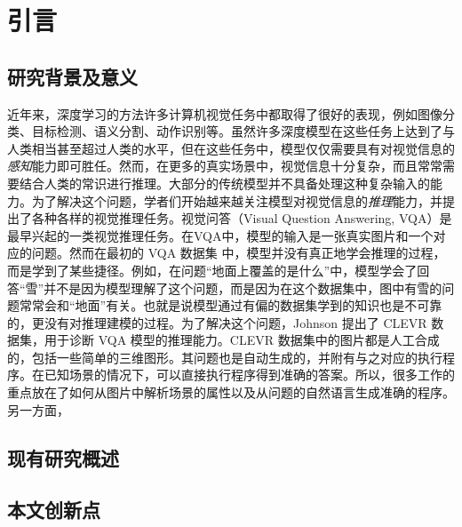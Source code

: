 
\chapter{引言}
\label{cha:intro}

\section{研究背景及意义}
近年来，深度学习的方法许多计算机视觉任务中都取得了很好的表现，例如图像分类\cite{he2016deep,krizhevsky2012imagenet}、目标检测\cite{}、语义分割\cite{}、动作识别\cite{}等。虽然许多深度模型在这些任务上达到了与人类相当甚至超过人类的水平，但在这些任务中，模型仅仅需要具有对视觉信息的\emph{感知}能力即可胜任。然而，在更多的真实场景中，视觉信息十分复杂，而且常常需要结合人类的常识进行推理。大部分的传统模型并不具备处理这种复杂输入的能力。为了解决这个问题，学者们开始越来越关注模型对视觉信息的\emph{推理}能力，并提出了各种各样的视觉推理任务。视觉问答（Visual Question Answering, VQA）是最早兴起的一类视觉推理任务\cite{}。在VQA中，模型的输入是一张真实图片和一个对应的问题。然而在最初的 VQA 数据集\cite{} 中，模型并没有真正地学会推理的过程，而是学到了某些捷径\cite{johnson2017clevr}。例如，在问题“地面上覆盖的是什么”中，模型学会了回答“雪”并不是因为模型理解了这个问题，而是因为在这个数据集中，图中有雪的问题常常会和“地面”有关。也就是说模型通过有偏的数据集学到的知识也是不可靠的，更没有对推理建模的过程。为了解决这个问题，Johnson \etal \cite{johnson2017clevr} 提出了 CLEVR 数据集，用于诊断 VQA 模型的推理能力。CLEVR 数据集中的图片都是人工合成的，包括一些简单的三维图形。其问题也是自动生成的，并附有与之对应的执行程序。在已知场景的情况下，可以直接执行程序得到准确的答案。所以，很多工作的重点放在了如何从图片中解析场景的属性以及从问题的自然语言生成准确的程序\cite{Johnson_2017_ICCV,yi2018neural,vedantam2019probabilistic}。另一方面，


\section{现有研究概述}
\section{本文创新点}